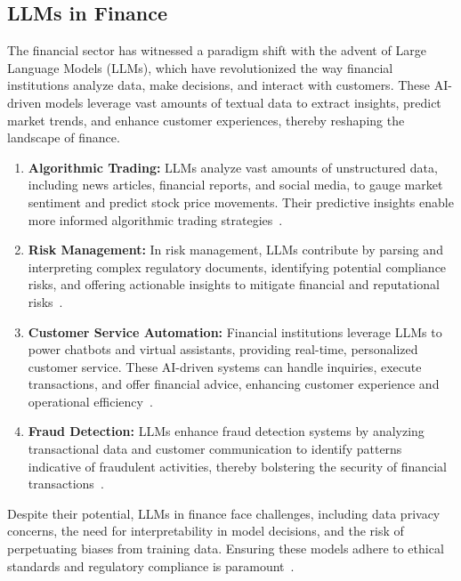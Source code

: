 \subsection{LLMs in Finance}
\label{subsec:llms-in-finance}

The financial sector has witnessed a paradigm shift with the advent of Large Language Models (LLMs), which have revolutionized the way financial institutions analyze data, make decisions, and interact with customers.
These AI-driven models leverage vast amounts of textual data to extract insights, predict market trends, and enhance customer experiences, thereby reshaping the landscape of finance.

\begin{enumerate}
    \item \textbf{Algorithmic Trading:}
    {LLMs analyze vast amounts of unstructured data, including news articles, financial reports, and social media, to gauge market sentiment and predict stock price movements.
    Their predictive insights enable more informed algorithmic trading strategies~\cite{buehler2018deep}.}

    \item \textbf{Risk Management:}
    {In risk management, LLMs contribute by parsing and interpreting complex regulatory documents, identifying potential compliance risks, and offering actionable insights to mitigate financial and reputational risks~\cite{li2020natural}.}

    \item \textbf{Customer Service Automation:}
    {Financial institutions leverage LLMs to power chatbots and virtual assistants, providing real-time, personalized customer service. These AI-driven systems can handle inquiries, execute transactions, and offer financial advice, enhancing customer experience and operational efficiency~\cite{pal2021enhancing}.}

    \item \textbf{Fraud Detection:}
    {LLMs enhance fraud detection systems by analyzing transactional data and customer communication to identify patterns indicative of fraudulent activities, thereby bolstering the security of financial transactions~\cite{smith2019improving}.}
\end{enumerate}

Despite their potential, LLMs in finance face challenges, including data privacy concerns, the need for interpretability in model decisions, and the risk of perpetuating biases from training data.
Ensuring these models adhere to ethical standards and regulatory compliance is paramount~\cite{jones2020ethical}.

